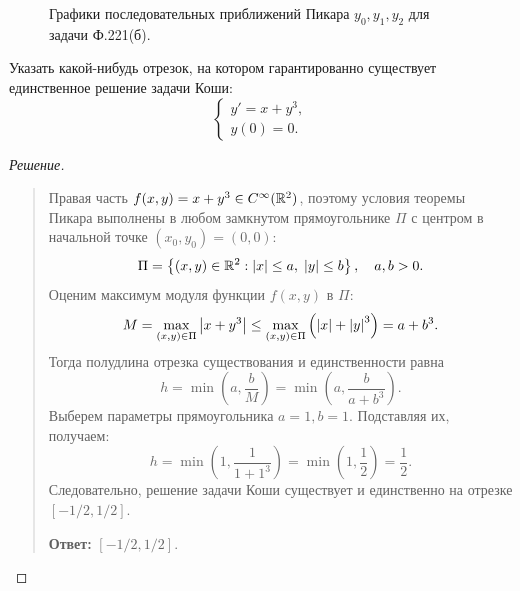 \begin{figure}[H]
    \centering
    \caption{Графики последовательных приближений Пикара $y_0, y_1, y_2$ для
    задачи Ф.221(б).}
\end{figure}

\begin{problem}[Ф.223(а)]
    Указать какой-нибудь отрезок, на котором гарантированно существует
    единственное решение задачи Коши:
    \[
        \begin{cases}
            y' = x + y^3, \\
            y(0) = 0.
        \end{cases}
    \]
\end{problem}

\begin{proof}[Решение]~\\
    \begin{quote}
        Правая часть $f(x, y) = x + y^3 \in C^\infty(\mathbb{R}^2)$, поэтому условия
        теоремы Пикара выполнены в любом замкнутом прямоугольнике $\Pi$ с
        центром в начальной точке $(x_0, y_0) = (0, 0)$:
        \[
            \Pi = \left\{ (x, y) \in \mathbb{R}^2 : \left| x \right| \le a, \;
            \left| y \right| \le b \right\}, \quad a, b > 0.
        \]
        Оценим максимум модуля функции $f(x, y)$ в $\Pi$:
        \[
            M = \max_{(x, y) \in \Pi} \left| x + y^3 \right| \le
            \max_{(x, y) \in \Pi} \left(\left| x \right| + \left| y \right|^3\right) = a + b^3.
        \]
        Тогда полудлина отрезка существования и единственности равна
        \[
            h = \min\left(a, \frac{b}{M}\right) =
            \min\left(a, \frac{b}{a + b^3}\right).
        \]
        Выберем параметры прямоугольника $a = 1, b = 1$. Подставляя их,
        получаем:
        \[
            h = \min\left(1, \frac{1}{1 + 1^3}\right) =
            \min\left(1, \frac{1}{2}\right) = \frac{1}{2}.
        \]
        Следовательно, решение задачи Коши существует и единственно на отрезке
        $[-1/2, 1/2]$.

        \textbf{Ответ:} $[-1/2, 1/2]$.
    \end{quote}
\end{proof}